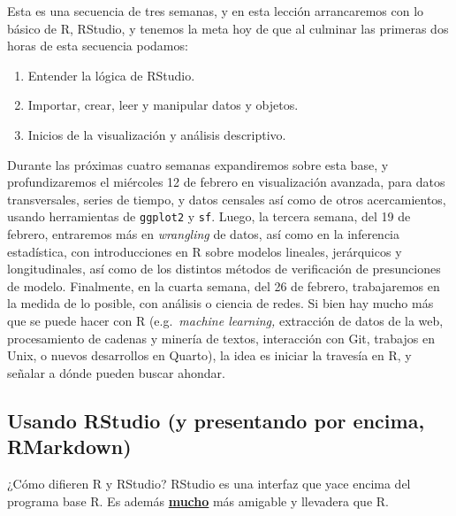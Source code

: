 \documentclass[
]{article}
\begin{document}
Esta es una secuencia de tres semanas, y en esta lección arrancaremos
con lo básico de R, RStudio, y tenemos la meta hoy de que al culminar
las primeras dos horas de esta secuencia podamos:

\begin{enumerate}
\def\labelenumi{\arabic{enumi}.}
\item
  Entender la lógica de RStudio.
\item
  Importar, crear, leer y manipular datos y objetos.
\item
  Inicios de la visualización y análisis descriptivo.
\end{enumerate}

Durante las próximas cuatro semanas expandiremos sobre esta base, y
profundizaremos el miércoles 12 de febrero en visualización avanzada,
para datos transversales, series de tiempo, y datos censales así como de
otros acercamientos, usando herramientas de \texttt{ggplot2} y
\texttt{sf}. Luego, la tercera semana, del 19 de febrero, entraremos más
en \emph{wrangling} de datos, así como en la inferencia estadística, con
introducciones en R sobre modelos lineales, jerárquicos y
longitudinales, así como de los distintos métodos de verificación de
presunciones de modelo. Finalmente, en la cuarta semana, del 26 de
febrero, trabajaremos en la medida de lo posible, con análisis o ciencia
de redes. Si bien hay mucho más que se puede hacer con R
(e.g.~\emph{machine learning,} extracción de datos de la web,
procesamiento de cadenas y minería de textos, interacción con Git,
trabajos en Unix, o nuevos desarrollos en Quarto), la idea es iniciar la
travesía en R, y señalar a dónde pueden buscar ahondar.

\subsection{Usando RStudio (y presentando por encima,
RMarkdown)}\label{usando-rstudio-y-presentando-por-encima-rmarkdown}

¿Cómo difieren R y RStudio? RStudio es una interfaz que yace encima del
programa base R. Es además \ul{\textbf{mucho}} más amigable y llevadera
que R.
\end{document}
